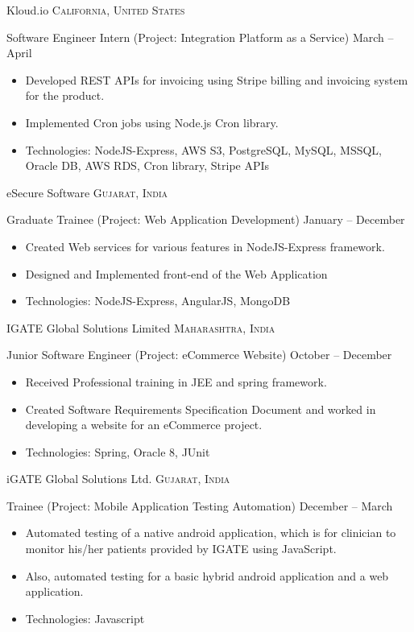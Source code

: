 \documentclass[10pt,a4paper]{article}
\begin{document}
{{{\headedsection  %
  {Kloud.io}
  {\textsc{California, United States}} {%
  \headedsubsection
    {Software Engineer Intern (Project: Integration Platform as a Service)}
    {March  -- April }
    {\bodytext
    {
    \begin{itemize}
        \item Developed REST APIs for invoicing using Stripe billing and invoicing system for the product.
        \item Implemented Cron jobs using Node.js Cron library.
        \item Technologies: NodeJS-Express, AWS S3, PostgreSQL, MySQL, MSSQL, Oracle DB, AWS RDS, Cron library, Stripe APIs
    \end{itemize}}}
}

\headedsection  %
  {eSecure Software}
  {\textsc{Gujarat, India}} {%
  \headedsubsection
    {Graduate Trainee (Project: Web Application Development)}
    {January  -- December }
    {\bodytext
    {
    \begin{itemize}
        \item Created Web services for various features in NodeJS-Express framework.
        \item Designed and Implemented front-end of the Web Application
        \item Technologies: NodeJS-Express, AngularJS, MongoDB
    \end{itemize}}}
}

\headedsection  %
  {IGATE Global Solutions Limited}
  {\textsc{Maharashtra, India}} {%
  \headedsubsection
    {Junior Software Engineer (Project: eCommerce Website)}
    {October  -- December }
    {\bodytext
    {
    \begin{itemize}
        \item Received Professional training in JEE and spring framework.
        \item Created Software Requirements Specification Document and worked in developing a website for an eCommerce project.
        \item Technologies: Spring, Oracle 8, JUnit
    \end{itemize}}}
}


\headedsection  %
  {iGATE Global Solutions Ltd.}
  {\textsc{Gujarat, India}} {%
  \headedsubsection
    {Trainee (Project: Mobile Application Testing Automation)}
    {December  -- March }
    {\bodytext
    {
    \begin{itemize}
        \item Automated testing of a native android application, which is for clinician to monitor his/her patients provided by IGATE using JavaScript.
        \item Also, automated testing for a basic hybrid android application and a web application.
        \item Technologies: Javascript
    \end{itemize}}}
}

}}}
\end{document}
